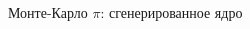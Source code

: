 \documentclass[@BEAMER_OPTIONS@]{beamer}
\begin{document}
\begin{frame}[fragile]{Монте-Карло $\pi$: сгенерированное ядро}
    \begin{columns}
        \begin{column}[t]{0.2\textwidth}
            \begin{exampleblock}{}
                \begin{adjustbox}{width=0.23\textwidth, height=\textheight, keepaspectratio}
                    \begin{minipage}{\textwidth}
                        
                    \end{minipage}
                \end{adjustbox}
            \end{exampleblock}
        \end{column}
        \begin{column}[t]{0.2\textwidth}
            \begin{exampleblock}{}
                \begin{adjustbox}{width=0.23\textwidth, height=\textheight, keepaspectratio}
                    \begin{minipage}{\textwidth}
                        
                    \end{minipage}
                \end{adjustbox}
            \end{exampleblock}
        \end{column}
        \begin{column}[t]{0.2\textwidth}
            \begin{exampleblock}{}
                \begin{adjustbox}{width=0.23\textwidth, height=\textheight, keepaspectratio}
                    \begin{minipage}{\textwidth}
                        
                    \end{minipage}
                \end{adjustbox}
            \end{exampleblock}
        \end{column}
        \begin{column}[t]{0.3\textwidth}
            \begin{exampleblock}{}

\end{exampleblock}
\end{column}
\end{columns}
\end{frame}
\end{document}
